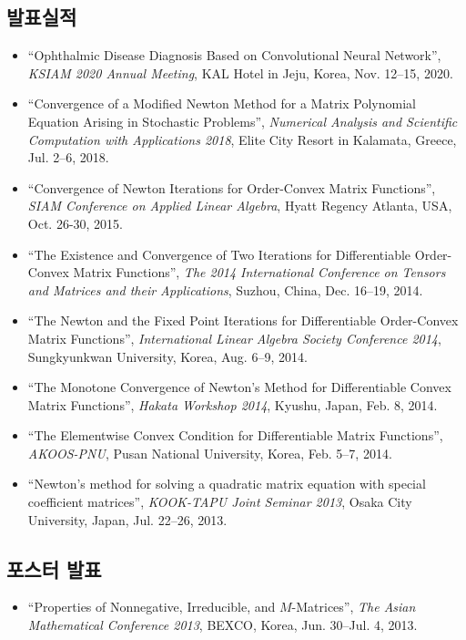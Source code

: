 \documentclass[11pt]{article} %
\begin{document}
\subsection*{발표실적}
\renewcommand\labelitemi{\tiny$\bullet$}
\newcommand\mypresent{
	\begin{itemize}[leftmargin=*]
		\item ``Ophthalmic Disease Diagnosis Based on Convolutional Neural Network'', {\it KSIAM 2020 Annual Meeting}, KAL Hotel in Jeju, Korea, Nov. 12--15, 2020.
		\item ``Convergence of a Modified Newton Method for a Matrix Polynomial Equation Arising in Stochastic Problems'', {\it Numerical Analysis and Scientific Computation with Applications 2018}, Elite City Resort in Kalamata, Greece, Jul. 2--6, 2018.
		\item ``Convergence of Newton Iterations for Order-Convex Matrix Functions'', {\it SIAM Conference on Applied Linear Algebra}, Hyatt Regency Atlanta, USA, Oct. 26-30, 2015.
		\item ``The Existence and Convergence of Two Iterations for Differentiable Order-Convex Matrix Functions'', {\it The 2014 International Conference on Tensors and Matrices and their Applications}, Suzhou, China, Dec. 16--19, 2014.
		\item ``The Newton and the Fixed Point Iterations for Differentiable Order-Convex Matrix Functions'', {\it International Linear Algebra Society Conference 2014}, Sungkyunkwan University, Korea, Aug. 6--9, 2014.
		\item ``The Monotone Convergence of Newton’s Method for Differentiable Convex Matrix Functions'', {\it Hakata Workshop 2014}, Kyushu, Japan, Feb. 8, 2014.
		\item ``The Elementwise Convex Condition for Differentiable Matrix Functions'', {\it AKOOS-PNU}, Pusan National University, Korea, Feb. 5--7, 2014.
		\item ``Newton’s method for solving a quadratic matrix equation with special coefficient matrices'', {\it KOOK-TAPU Joint Seminar 2013}, Osaka City University, Japan, Jul. 22--26, 2013.
		
	\end{itemize}
}
\mypresent

\subsection*{포스터 발표}
\newcommand\myposter{
	\begin{itemize}[leftmargin=*]
		\item ``Properties of Nonnegative, Irreducible, and $M$-Matrices'', {\it The Asian Mathematical Conference 2013}, BEXCO, Korea, Jun. 30--Jul. 4, 2013.
	\end{itemize}
}
\myposter
\end{document}

